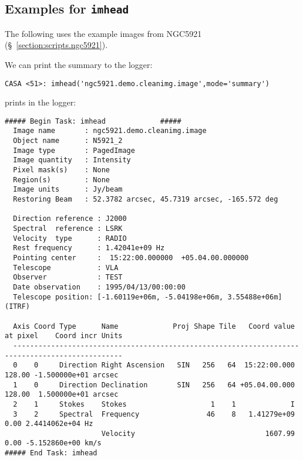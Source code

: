 \subsection{Examples for {\tt imhead}}
\label{section:analysis.imhead.examples}

The following uses the example images from NGC5921
(\S~\ref{section:scripts.ngc5921}).

We can print the summary to the logger:
\small
\begin{verbatim}
CASA <51>: imhead('ngc5921.demo.cleanimg.image',mode='summary')
\end{verbatim}
\normalsize
prints in the logger: 
\small
\begin{verbatim}
##### Begin Task: imhead             #####
  Image name       : ngc5921.demo.cleanimg.image
  Object name      : N5921_2
  Image type       : PagedImage
  Image quantity   : Intensity
  Pixel mask(s)    : None
  Region(s)        : None
  Image units      : Jy/beam
  Restoring Beam   : 52.3782 arcsec, 45.7319 arcsec, -165.572 deg
  
  Direction reference : J2000
  Spectral  reference : LSRK
  Velocity  type      : RADIO
  Rest frequency      : 1.42041e+09 Hz
  Pointing center     :  15:22:00.000000  +05.04.00.000000
  Telescope           : VLA
  Observer            : TEST
  Date observation    : 1995/04/13/00:00:00
  Telescope position: [-1.60119e+06m, -5.04198e+06m, 3.55488e+06m] (ITRF)
  
  Axis Coord Type      Name             Proj Shape Tile   Coord value at pixel    Coord incr Units
  ------------------------------------------------------------------------------------------------ 
  0    0     Direction Right Ascension   SIN   256   64  15:22:00.000   128.00 -1.500000e+01 arcsec
  1    0     Direction Declination       SIN   256   64 +05.04.00.000   128.00  1.500000e+01 arcsec
  2    1     Stokes    Stokes                    1    1             I
  3    2     Spectral  Frequency                46    8   1.41279e+09     0.00 2.4414062e+04 Hz
                       Velocity                               1607.99     0.00 -5.152860e+00 km/s
##### End Task: imhead           
\end{verbatim}
\normalsize

